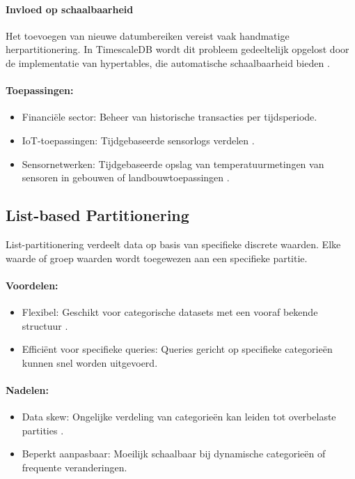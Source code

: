 \paragraph{Invloed op schaalbaarheid} 
Het toevoegen van nieuwe datumbereiken vereist vaak handmatige herpartitionering. In TimescaleDB wordt dit probleem gedeeltelijk opgelost door de implementatie van hypertables, die automatische schaalbaarheid bieden \autocite{TimescaleDBDocumentation}.

\paragraph{Toepassingen:}
\begin{itemize}
    \item Financiële sector: Beheer van historische transacties per tijdsperiode.
    \item IoT-toepassingen: Tijdgebaseerde sensorlogs verdelen \autocite{Ponnusamy2024}.
    \item Sensornetwerken: Tijdgebaseerde opslag van temperatuurmetingen van sensoren in gebouwen of landbouwtoepassingen \autocite{Mahmud2020}.
\end{itemize}
 
\subsection{List-based Partitionering}
List-partitionering verdeelt data op basis van specifieke discrete waarden. Elke waarde of groep waarden wordt toegewezen aan een specifieke partitie.
 
\paragraph{Voordelen:}
\begin{itemize}
    \item Flexibel: Geschikt voor categorische datasets met een vooraf bekende structuur \autocite{Mahmud2020}.
    \item Efficiënt voor specifieke queries: Queries gericht op specifieke categorieën kunnen snel worden uitgevoerd.
\end{itemize}
 
\paragraph{Nadelen:}
\begin{itemize}
    \item Data skew: Ongelijke verdeling van categorieën kan leiden tot overbelaste partities \autocite{Mahmud2020}.
    \item Beperkt aanpasbaar: Moeilijk schaalbaar bij dynamische categorieën of frequente veranderingen.
\end{itemize}
 
